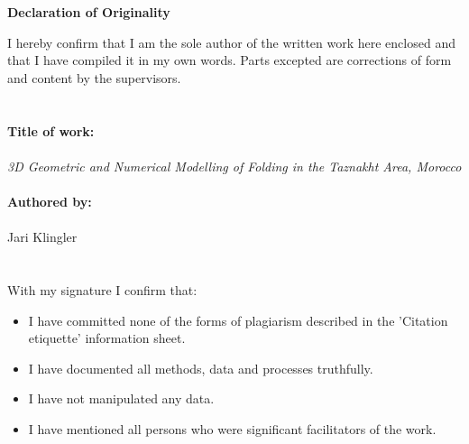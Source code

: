\documentclass[a4paper,11pt,titlepage]{article}
\begin{document}
\maketitle

\newpage



\thispagestyle{empty} 
\vspace{0.5cm}
\begin{center}
\LARGE{\textbf{Declaration of Originality}} \\
\end{center}
\vspace{1.5cm}
\noindent I hereby confirm that I am the sole author of the written work here enclosed and that I have compiled it in my own words. Parts excepted are corrections of form and content by the supervisors. \\
\\
\\
\noindent \textbf{Title of work:}\\
\\
\textit{3D Geometric and Numerical Modelling of Folding in the Taznakht Area, Morocco}
\\ \\
\noindent \textbf{Authored by:}\\
\\
Jari Klingler
\\
\\
\\
\noindent With my signature I confirm that:\\
\begin{itemize}
    \item I have committed none of the forms of plagiarism described in the 'Citation etiquette' information sheet.
    \item I have documented all methods, data and processes truthfully.
    \item I have not manipulated any data. 
    \item I have mentioned all persons who were significant facilitators of the work. 
\end{itemize}
\vspace{1.5cm}
 
\end{document}

